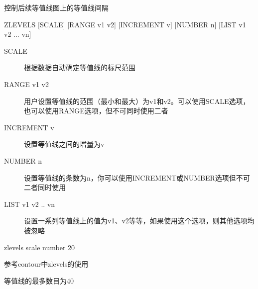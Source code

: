 \label{cmd:zlevels}

控制后续等值线图上的等值线间隔

\begin{SACSTX}
ZLEVELS [SCALE] [RANGE v1 v2] [INCREMENT v] [NUMBER n] [LIST v1 v2 ... vn]
\end{SACSTX}

\begin{description}
\item [SCALE] 根据数据自动确定等值线的标尺范围 
\item [RANGE v1 v2] 用户设置等值线的范围（最小和最大）为v1和v2。可以使用SCALE选项，也可以使用RANGE选项，但不可同时使用二者 
\item [INCREMENT v] 设置等值线之间的增量为v 
\item [NUMBER n] 设置等值线的条数为n，你可以使用INCREMENT或NUMBER选项但不可二者同时使用 
\item [LIST v1 v2 .. vn] 设置一系列等值线上的值为v1、v2等等，如果使用这个选项，则其他选项均被忽略 
\end{description}

\begin{SACDFT}
zlevels scale number 20
\end{SACDFT}

参考contour中zlevels的使用

等值线的最多数目为40

